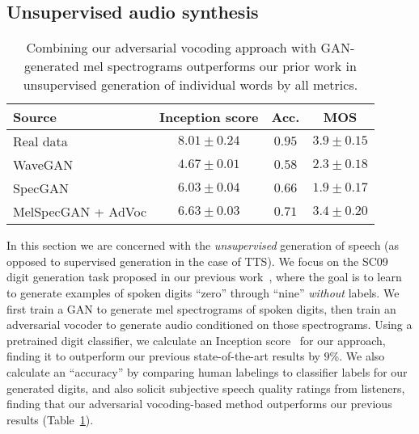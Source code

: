 \documentclass[a4paper]{article}
\begin{document}

\subsection{Unsupervised audio synthesis}

\begingroup
\setlength{\tabcolsep}{6pt}
\begin{table}[t]
\centering
\caption{Combining our adversarial vocoding approach with GAN-generated mel spectrograms outperforms our prior work in unsupervised generation of individual words by all metrics.}
\vspace{2mm}
\footnotesize
\begin{tabular}{lccc}
\toprule
Source & Inception score & Acc. & MOS  \\
\midrule
Real data & $8.01 \pm 0.24$ & $0.95$ & $3.9 \pm 0.15$ \\
WaveGAN \cite{donahue2019wavegan} & $4.67 \pm 0.01$ & $0.58$ & $2.3 \pm 0.18$   \\
SpecGAN \cite{donahue2019wavegan} & $6.03 \pm 0.04$ & $0.66$ & $1.9 \pm 0.17$ \\
MelSpecGAN + AdVoc & $6.63 \pm 0.03$ & $0.71$ & $3.4 \pm 0.20$ \\
\bottomrule
\end{tabular} 
\label{tab:sc09Small}
\end{table}
\endgroup

In this section we are concerned with the \emph{unsupervised} generation of speech (as opposed to supervised generation in the case of TTS). 
We focus on the SC09 digit generation task proposed in our previous work~\cite{donahue2019wavegan}, 
where the goal is to learn to generate examples of spoken digits ``zero'' through ``nine'' \emph{without} labels. 
We first train a GAN to generate mel spectrograms of spoken digits, then train an adversarial vocoder to generate audio conditioned on those spectrograms. 
Using a pretrained digit classifier, 
we calculate an Inception score~\cite{salimans2016improved} for our approach, finding it to outperform our previous state-of-the-art results by $9$\%. 
We also calculate an ``accuracy'' by comparing human labelings to classifier labels for our generated digits, and also solicit subjective speech quality ratings from listeners, finding that our adversarial vocoding-based method outperforms our previous results (Table~\ref{tab:sc09Small}).
\end{document}
